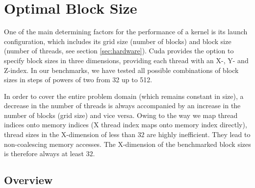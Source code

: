 \section{Optimal Block Size} \label{sec:res-blocksize}



One of the main determining factors for the performance of a kernel is its launch configuration, which includes its grid size (number of blocks) and block size (number of threads, see section \ref{sec:hardware}). Cuda provides the option to specify block sizes in three dimensions, providing each thread with an X-, Y- and Z-index. In our benchmarks, we have tested all possible combinations of block sizes in steps of powers of two from 32 up to 512.

In order to cover the entire problem domain (which remains constant in size), a decrease in the number of threads is always accompanied by an increase in the number of blocks (grid size) and vice versa. Owing to the way we map thread indices onto memory indices (X thread index maps onto memory index directly), thread sizes in the X-dimension of less than $32$ are highly inefficient. They lead to non-coalescing memory accesses. The X-dimension of the benchmarked block sizes is therefore always at least $32$.

\subsection{Overview}

